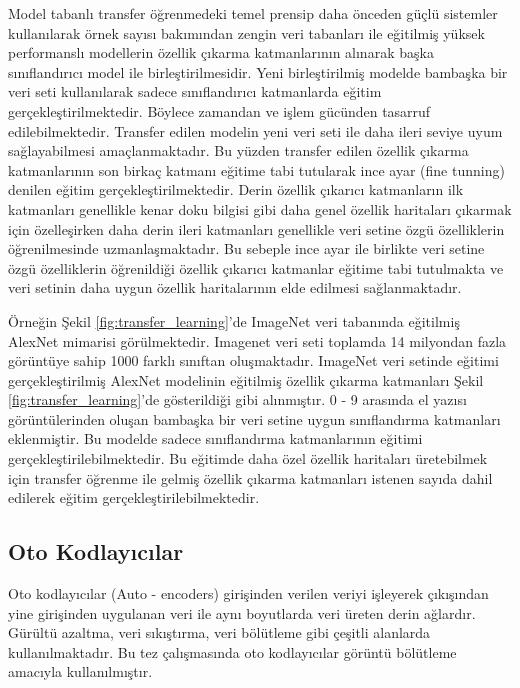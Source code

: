 Model tabanlı transfer öğrenmedeki temel prensip daha önceden güçlü sistemler kullanılarak örnek sayısı bakımından zengin veri tabanları ile eğitilmiş yüksek performanslı modellerin özellik çıkarma katmanlarının alınarak başka sınıflandırıcı model ile birleştirilmesidir. Yeni birleştirilmiş modelde bambaşka bir veri seti kullanılarak sadece sınıflandırıcı katmanlarda eğitim gerçekleştirilmektedir. Böylece zamandan ve işlem gücünden tasarruf edilebilmektedir. Transfer edilen modelin yeni veri seti ile daha ileri seviye uyum sağlayabilmesi amaçlanmaktadır. Bu yüzden transfer edilen özellik çıkarma katmanlarının son birkaç katmanı eğitime tabi tutularak ince ayar (fine tunning) denilen eğitim gerçekleştirilmektedir. Derin özellik çıkarıcı katmanların ilk katmanları genellikle kenar doku bilgisi gibi daha genel özellik haritaları çıkarmak için özelleşirken daha derin ileri katmanları genellikle veri setine özgü özelliklerin öğrenilmesinde uzmanlaşmaktadır. Bu sebeple ince ayar ile birlikte veri setine özgü özelliklerin öğrenildiği özellik çıkarıcı katmanlar eğitime tabi tutulmakta ve veri setinin daha uygun özellik haritalarının elde edilmesi sağlanmaktadır.

Örneğin Şekil \ref{fig:transfer_learning}'de ImageNet veri tabanında eğitilmiş AlexNet mimarisi görülmektedir. Imagenet veri seti toplamda 14 milyondan fazla görüntüye sahip 1000 farklı sınıftan oluşmaktadır. ImageNet veri setinde eğitimi gerçekleştirilmiş AlexNet modelinin eğitilmiş özellik çıkarma katmanları Şekil \ref{fig:transfer_learning}'de gösterildiği gibi alınmıştır. 0 - 9 arasında el yazısı görüntülerinden oluşan bambaşka bir veri setine uygun sınıflandırma katmanları eklenmiştir. Bu modelde sadece sınıflandırma katmanlarının eğitimi gerçekleştirilebilmektedir. Bu eğitimde daha özel özellik haritaları üretebilmek için transfer öğrenme ile gelmiş özellik çıkarma katmanları istenen sayıda dahil edilerek eğitim gerçekleştirilebilmektedir. 

\subsection{Oto Kodlayıcılar}
Oto kodlayıcılar (Auto - encoders) girişinden verilen veriyi işleyerek çıkışından yine girişinden uygulanan veri ile aynı boyutlarda veri üreten derin ağlardır. Gürültü azaltma, veri sıkıştırma, veri bölütleme gibi çeşitli alanlarda kullanılmaktadır. Bu tez çalışmasında oto kodlayıcılar görüntü bölütleme amacıyla kullanılmıştır.


